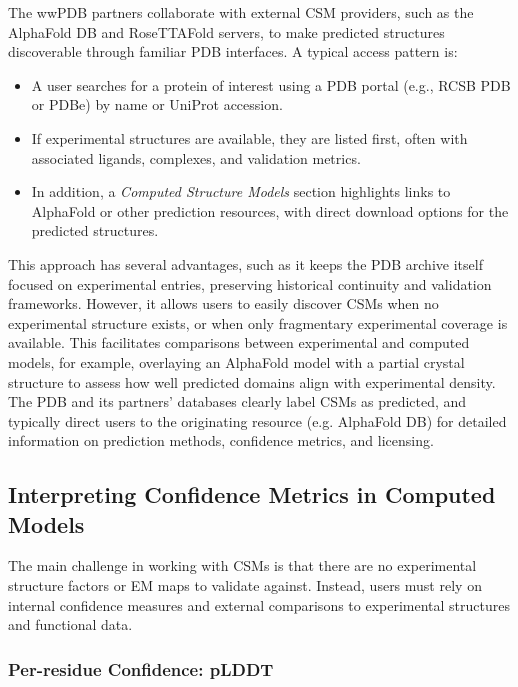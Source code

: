 \documentclass[12pt]{article}
\begin{document}
The wwPDB partners collaborate with external CSM providers, such as the AlphaFold DB and RoseTTAFold servers, to make predicted structures discoverable through familiar PDB interfaces.\cite{CH4_wwpdb2019protein,CH4_Varadi2022_AlphaFoldDB} A typical access pattern is:
\begin{itemize}
  \item A user searches for a protein of interest using a PDB portal (e.g., RCSB PDB or PDBe) by name or UniProt accession.
  \item If experimental structures are available, they are listed first, often with associated ligands, complexes, and validation metrics.
  \item In addition, a \emph{Computed Structure Models} section highlights links to AlphaFold or other prediction resources, with direct download options for the predicted structures.

\end{itemize}

This approach has several advantages, such as it keeps the PDB archive itself focused on experimental entries, preserving historical continuity and validation frameworks. However, it allows users to easily discover CSMs when no experimental structure exists, or when only fragmentary experimental coverage is available. This facilitates comparisons between experimental and computed models, for example, overlaying an AlphaFold model with a partial crystal structure to assess how well predicted domains align with experimental density. The PDB and its partners' databases clearly label CSMs as predicted, and typically direct users to the originating resource (e.g. AlphaFold DB) for detailed information on prediction methods, confidence metrics, and licensing.\cite{CH4_Varadi2022_AlphaFoldDB,CH4_Burley2022}

\subsection{Interpreting Confidence Metrics in Computed Models}

The main challenge in working with CSMs is that there are no experimental structure factors or EM maps to validate against. Instead, users must rely on internal confidence measures and external comparisons to experimental structures and functional data.
\subsubsection{Per-residue Confidence: pLDDT}
\end{document}
